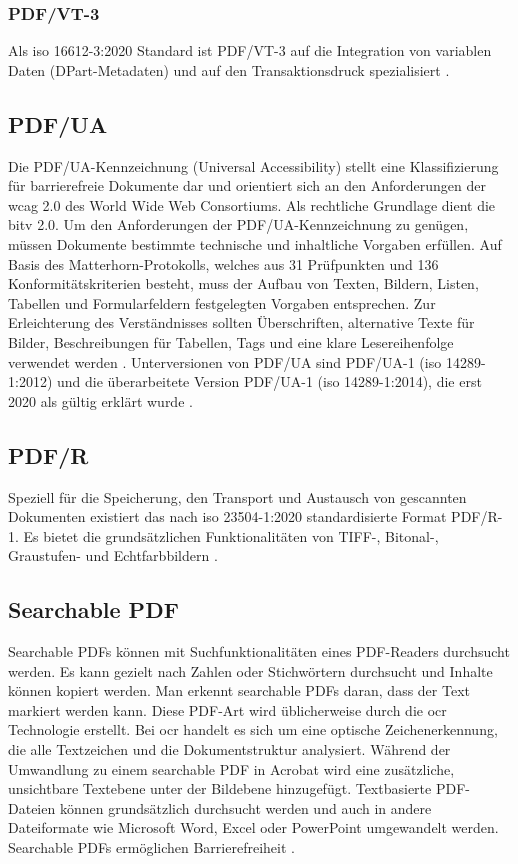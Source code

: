 \subsubsection{PDF/VT-3}
Als \gls{iso} 16612-3:2020 Standard ist PDF/VT-3 auf die Integration von variablen Daten (DPart-Metadaten) und auf den Transaktionsdruck spezialisiert  \cite{proj-consult}.

\subsection{PDF/UA}
Die PDF/UA-Kennzeichnung (Universal Accessibility) stellt eine Klassifizierung für barrierefreie Dokumente dar und orientiert sich an den Anforderungen der \gls{wcag} 2.0 des World Wide Web Consortiums. Als rechtliche Grundlage dient die \gls{bitv} 2.0. Um den Anforderungen der PDF/UA-Kennzeichnung zu genügen, müssen Dokumente bestimmte technische und inhaltliche Vorgaben erfüllen. Auf Basis des Matterhorn-Protokolls, welches aus 31 Prüfpunkten und 136 Konformitätskriterien besteht, muss der Aufbau von Texten, Bildern, Listen, Tabellen und Formularfeldern festgelegten Vorgaben entsprechen. Zur Erleichterung des Verständnisses sollten Überschriften, alternative Texte für Bilder, Beschreibungen für Tabellen, Tags und eine klare Lesereihenfolge verwendet werden \cite{adobe-pdf-ua}. Unterversionen von PDF/UA sind PDF/UA-1 (\gls{iso} 14289-1:2012) und die überarbeitete Version PDF/UA-1 (\gls{iso} 14289-1:2014), die erst 2020 als gültig erklärt wurde \cite{proj-consult}.

\subsection{PDF/R}
Speziell für die Speicherung, den Transport und Austausch von gescannten Dokumenten existiert das nach \gls{iso} 23504-1:2020 standardisierte Format PDF/R-1. Es bietet die grundsätzlichen Funktionalitäten von TIFF-, Bitonal-, Graustufen- und Echtfarbbildern \cite{proj-consult}.  

\subsection{Searchable PDF}
Searchable PDFs können mit Suchfunktionalitäten eines PDF-Readers durchsucht werden. Es kann gezielt nach Zahlen oder Stichwörtern durchsucht und Inhalte können kopiert werden. Man erkennt searchable PDFs daran, dass der Text markiert werden kann. Diese PDF-Art wird üblicherweise durch die \gls{ocr} Technologie erstellt. Bei \gls{ocr} handelt es sich um eine optische Zeichenerkennung, die alle Textzeichen und die Dokumentstruktur analysiert. Während der Umwandlung zu einem searchable PDF in Acrobat wird eine zusätzliche, unsichtbare Textebene unter der Bildebene hinzugefügt. Textbasierte PDF-Dateien können grundsätzlich durchsucht werden und auch in andere Dateiformate wie Microsoft Word, Excel oder PowerPoint umgewandelt werden. Searchable PDFs ermöglichen Barrierefreiheit \cite{adobe-search}. 